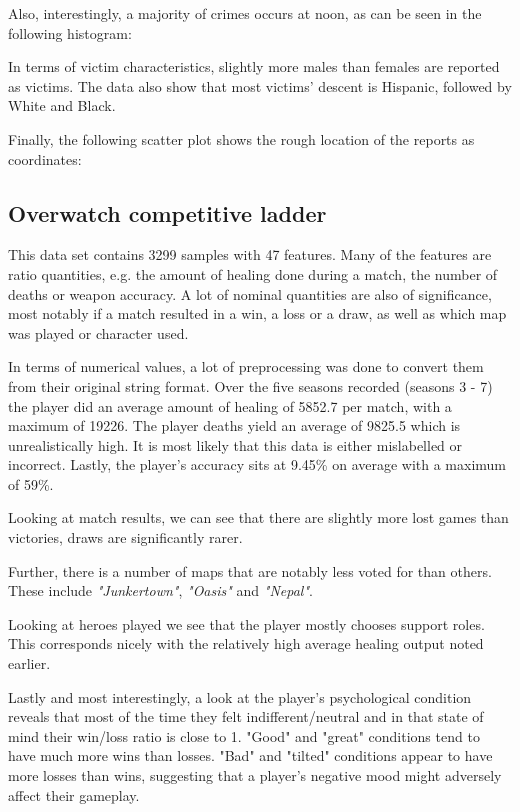 \documentclass{article}
\begin{document}
Also, interestingly, a majority of crimes occurs at noon, as can be seen in the following histogram:


In terms of victim characteristics, slightly more males than females are reported as victims.
The data also show that most victims' descent is Hispanic, followed by White and Black.


Finally, the following scatter plot shows the rough location of the reports as coordinates:


\subsection*{Overwatch competitive ladder}
This data set contains 3299 samples with 47 features.
Many of the features are ratio quantities, e.g. the amount of healing done during a match, the number of deaths or weapon accuracy.
A lot of nominal quantities are also of significance, most notably if a match resulted in a win, a loss or a draw, as well as which map was played or character used.

In terms of numerical values, a lot of preprocessing was done to convert them from their original string format.
Over the five seasons recorded (seasons 3 - 7) the player did an average amount of healing of 5852.7 per match, with a maximum of 19226.
The player deaths yield an average of 9825.5 which is unrealistically high.
It is most likely that this data is either mislabelled or incorrect.
Lastly, the player's accuracy sits at 9.45\% on average with a maximum of 59\%.

Looking at match results, we can see that there are slightly more lost games than victories, draws are significantly rarer.


Further, there is a number of maps that are notably less voted for than others.
These include \textit{"Junkertown"}, \textit{"Oasis"} and \textit{"Nepal"}.


Looking at heroes played we see that the player mostly chooses support roles.
This corresponds nicely with the relatively high average healing output noted earlier.


Lastly and most interestingly, a look at the player's psychological condition reveals that most of the time they felt indifferent/neutral and in that state of mind their win/loss ratio is close to 1.
"Good" and "great" conditions tend to have much more wins than losses.
"Bad" and "tilted" conditions appear to have more losses than wins, suggesting that a player's negative mood might adversely affect their gameplay.

\end{document}
